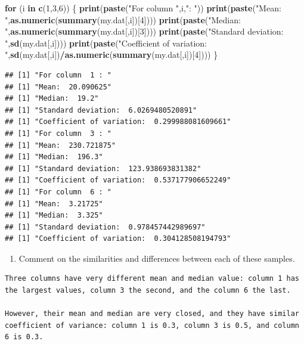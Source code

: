 \documentclass[
]{article}
\newenvironment{Shaded}{\begin{snugshade}}{\end{snugshade}}
\newcommand{\ControlFlowTok}[1]{\textcolor[rgb]{0.13,0.29,0.53}{\textbf{#1}}}
\newcommand{\DecValTok}[1]{\textcolor[rgb]{0.00,0.00,0.81}{#1}}
\newcommand{\KeywordTok}[1]{\textcolor[rgb]{0.13,0.29,0.53}{\textbf{#1}}}
\newcommand{\NormalTok}[1]{#1}
\newcommand{\OperatorTok}[1]{\textcolor[rgb]{0.81,0.36,0.00}{\textbf{#1}}}
\newcommand{\StringTok}[1]{\textcolor[rgb]{0.31,0.60,0.02}{#1}}
\providecommand{\tightlist}{%
  \setlength{\itemsep}{0pt}\setlength{\parskip}{0pt}}
\begin{document}
\begin{Shaded}
\begin{Highlighting}[]
\ControlFlowTok{for}\NormalTok{ (i }\ControlFlowTok{in} \KeywordTok{c}\NormalTok{(}\DecValTok{1}\NormalTok{,}\DecValTok{3}\NormalTok{,}\DecValTok{6}\NormalTok{)) \{}
  \KeywordTok{print}\NormalTok{(}\KeywordTok{paste}\NormalTok{(}\StringTok{"For column "}\NormalTok{,i,}\StringTok{": "}\NormalTok{))}
  \KeywordTok{print}\NormalTok{(}\KeywordTok{paste}\NormalTok{(}\StringTok{"Mean: "}\NormalTok{,}\KeywordTok{as.numeric}\NormalTok{(}\KeywordTok{summary}\NormalTok{(my.dat[,i])[}\DecValTok{4}\NormalTok{])))}
  \KeywordTok{print}\NormalTok{(}\KeywordTok{paste}\NormalTok{(}\StringTok{"Median: "}\NormalTok{,}\KeywordTok{as.numeric}\NormalTok{(}\KeywordTok{summary}\NormalTok{(my.dat[,i])[}\DecValTok{3}\NormalTok{])))}
  \KeywordTok{print}\NormalTok{(}\KeywordTok{paste}\NormalTok{(}\StringTok{"Standard deviation: "}\NormalTok{,}\KeywordTok{sd}\NormalTok{(my.dat[,i])))}
  \KeywordTok{print}\NormalTok{(}\KeywordTok{paste}\NormalTok{(}\StringTok{"Coefficient of variation: "}\NormalTok{,}\KeywordTok{sd}\NormalTok{(my.dat[,i])}\OperatorTok{/}\KeywordTok{as.numeric}\NormalTok{(}\KeywordTok{summary}\NormalTok{(my.dat[,i])[}\DecValTok{4}\NormalTok{])))}
\NormalTok{\}}
\end{Highlighting}
\end{Shaded}

\begin{verbatim}
## [1] "For column  1 : "
## [1] "Mean:  20.090625"
## [1] "Median:  19.2"
## [1] "Standard deviation:  6.0269480520891"
## [1] "Coefficient of variation:  0.299988081609661"
## [1] "For column  3 : "
## [1] "Mean:  230.721875"
## [1] "Median:  196.3"
## [1] "Standard deviation:  123.938693831382"
## [1] "Coefficient of variation:  0.537177906652249"
## [1] "For column  6 : "
## [1] "Mean:  3.21725"
## [1] "Median:  3.325"
## [1] "Standard deviation:  0.978457442989697"
## [1] "Coefficient of variation:  0.304128508194793"
\end{verbatim}

\begin{enumerate}
\def\labelenumi{\arabic{enumi}.}
\setcounter{enumi}{3}
\tightlist
\item
  Comment on the similarities and differences between each of these
  samples.
\end{enumerate}

\begin{verbatim}
Three columns have very different mean and median value: column 1 has the largest values, column 3 the second, and the column 6 the last.

However, their mean and median are very closed, and they have similar coefficient of variance: column 1 is 0.3, column 3 is 0.5, and column 6 is 0.3.
\end{verbatim}
\end{document}
